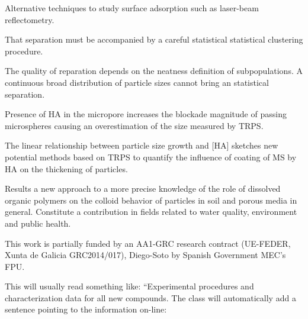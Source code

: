 \documentclass[journal=langd5,manuscript=article]{achemso}
\begin{document}
Alternative techniques to study surface adsorption such as laser-beam reflectometry.

That separation must be accompanied by a careful statistical statistical clustering procedure.

The quality of reparation depends on the neatness definition of subpopulations. A continuous broad distribution of particle sizes cannot bring an statistical separation.


Presence of HA in the micropore increases the blockade magnitude of passing microspheres causing an overestimation of the size measured by TRPS.


The linear relationship  between particle size growth and [HA] sketches new potential methods based on TRPS to
quantify the influence of coating of MS by HA on the thickening of particles.

Results   a new approach to a more precise knowledge of the role of dissolved
organic polymers on the colloid behavior of particles  in soil and porous media in general. Constitute a contribution in fields related to 
water quality, environment and public health.



\begin{acknowledgement}

This
work is partially funded by an AA1-GRC research contract (UE-FEDER,
Xunta de Galicia GRC2014/017), Diego-Soto by Spanish Government MEC’s FPU.

\end{acknowledgement}

\begin{suppinfo}

This will usually read something like: ``Experimental procedures and
characterization data for all new compounds. The class will
automatically add a sentence pointing to the information on-line:

\end{suppinfo}


\end{document}
